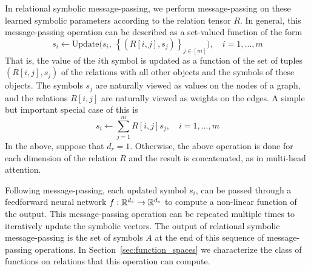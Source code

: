 In relational symbolic message-passing, we perform message-passing on these learned symbolic parameters according to the relation tensor $R$. In general, this message-passing operation can be described as a set-valued function of the form
\begin{equation}
    \label{eq:symbolic_message_passing}
    s_i \leftarrow \text{Update}\Big( s_i, \ \left\{ \left(R[i,j], s_j\right)\right\}_{j\in[m]}\Big), \quad i = 1, \ldots, m
\end{equation}
That is, the value of the $i$th symbol is updated as a function of the set of tuples $(R[i,j], s_j)$ of the relations with all other objects and the symbols of these objects. The symbols $s_j$ are naturally viewed
as values on the nodes of a graph, and the relations $R[i,j]$ are naturally viewed as weights on the edges. A simple but important special case of this is
\begin{equation}
    \label{eq:linear_symbolic_mp}
    s_i \leftarrow \sum_{j=1}^{m} R[i,j] s_j, \quad i=1, \ldots, m
\end{equation}
In the above, suppose that $d_r = 1$. Otherwise, the above operation is done for each dimension of the relation $R$ and the result is concatenated, as in multi-head attention.

Following message-passing, each updated symbol $s_i$, can be passed through a feedforward neural network $f:\mathbb{R}^{d_s}\rightarrow \mathbb{R}^{d_s}$ to compute a non-linear function of the output. %
This message-passing operation can be repeated multiple times to iteratively update the symbolic vectors.  The output of relational symbolic message-passing is the set of symbols $A$ at the end of this sequence of message-passing operations. %
In Section~\ref{sec:function_spaces} we characterize the class of functions on relations that this operation can compute.

